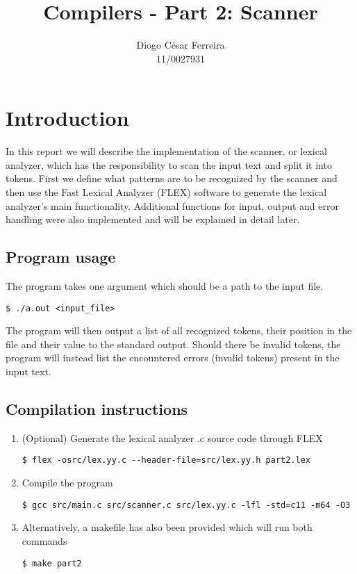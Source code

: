 \documentclass[12pt]{article}
\begin{document}
\title{Compilers - Part 2: Scanner }
\author{Diogo César Ferreira\\11/0027931}
\maketitle

\section{Introduction}
In this report we will describe the implementation of the scanner, or lexical analyzer,
which has the responsibility to scan the input text and split it into tokens.
First we define what patterns are to be recognized by the scanner and then use the Fast Lexical
Analyzer (FLEX) \cite{FLEX} software to generate the lexical analyzer's main functionality.
Additional functions for input, output and error handling were also implemented and will be
explained in detail later.

\subsection{Program usage}
The program takes one argument which should be a path to the input file.

\begin{lstlisting}
$ ./a.out <input_file>
\end{lstlisting}

The program will then output a list of all recognized tokens, their position in the file and their
value to the standard output. Should there be invalid tokens, the program will instead list the
encountered errors (invalid tokens) present in the input text.

\subsection{Compilation instructions}

\begin{enumerate}
\item (Optional) Generate the lexical analyzer .c source code through FLEX
\begin{lstlisting}
$ flex -osrc/lex.yy.c --header-file=src/lex.yy.h part2.lex
\end{lstlisting}

\item Compile the program
\begin{lstlisting}
$ gcc src/main.c src/scanner.c src/lex.yy.c -lfl -std=c11 -m64 -O3
\end{lstlisting}

\item Alternatively, a makefile has also been provided which will run both commands
\begin{lstlisting}
$ make part2
\end{lstlisting}
\end{enumerate}
\end{document}
